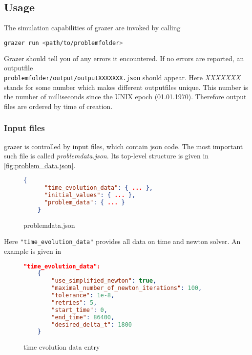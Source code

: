 \documentclass[a4paper]{article}
\newcommand{\sco
}{\textunderscore{}}
\begin{document}
\subsection{Usage}
\label{sec:usage}
The simulation capabilities of grazer are invoked by calling
\begin{lstlisting}[language=bash,caption={Invocation},basicstyle=\scriptsize\ttfamily\color{blue}]
grazer run <path/to/problemfolder>
\end{lstlisting}
Grazer should tell you of any errors it encountered. If no errors are reported, an outputfile\\
\verb|problemfolder/output/outputXXXXXXX.json| should appear. Here
\emph{XXXXXXX} stands for some number which makes different outputfiles unique.
This number is the number of milliseconds since the UNIX epoch (01.01.1970).
Therefore output files are ordered by time of creation.


\subsubsection{Input files}
\label{sec:input-files}
grazer is controlled by input files, which contain json code.
The most important such file is called \emph{problem\sco data.json}. Its top-level structure is given in \autoref{fig:problem_data.json}.

\begin{figure}[ht]
  \centering
  \begin{lstlisting}[language=json,firstnumber=1]
    {
      "time_evolution_data": { ... },
      "initial_values": { ... },
      "problem_data": { ... }
    }
  \end{lstlisting}
  \caption{problem\sco data.json}
  \label{fig:problem_data.json}
\end{figure}
Here \verb|"time_evolution_data"| provides all data on time and newton solver. An example is given in

\begin{figure}[ht]
  \centering
\begin{lstlisting}[language=json,firstnumber=1]
    "time_evolution_data":
    {
        "use_simplified_newton": true,
        "maximal_number_of_newton_iterations": 100,
        "tolerance": 1e-8,
        "retries": 5,
        "start_time": 0,
        "end_time": 86400,
        "desired_delta_t": 1800
    }
\end{lstlisting}
  \caption{time evolution data entry}
  \label{fig:time_evolution_data}
\end{figure}
\end{document}

